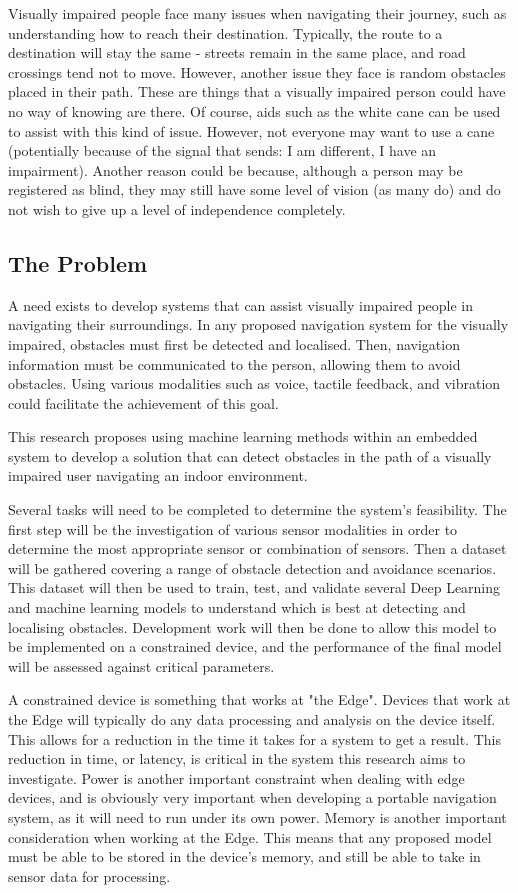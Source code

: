 \documentclass[conference]{IEEEtran}
\begin{document}
Visually impaired people face many issues when navigating their journey, such as understanding how to reach their destination. Typically, the route to a destination will stay the same - streets remain in the same place, and road crossings tend not to move. However, another issue they face is random obstacles placed in their path. These are things that a visually impaired person could have no way of knowing are there. Of course, aids such as the white cane can be used to assist with this kind of issue. However, not everyone may want to use a cane (potentially because of the signal that sends: I am different, I have an impairment). Another reason could be because, although a person may be registered as blind, they may still have some level of vision (as many do) and do not wish to give up a level of independence completely. 

\subsection{The Problem}
A need exists to develop systems that can assist visually impaired people in navigating their surroundings. In any proposed navigation system for the visually impaired, obstacles must first be detected and localised. Then, navigation information must be communicated to the person, allowing them to avoid obstacles. Using various modalities such as voice, tactile feedback, and vibration could facilitate the achievement of this goal.
 
This research proposes using machine learning methods within an embedded system to develop a solution that can detect obstacles in the path of a visually impaired user navigating an indoor environment. 
 
Several tasks will need to be completed to determine the system's feasibility. The first step will be the investigation of various sensor modalities in order to determine the most appropriate sensor or combination of sensors. Then a dataset will be gathered covering a range of obstacle detection and avoidance scenarios. This dataset will then be used to train, test, and validate several Deep Learning and machine learning models to understand which is best at detecting and localising obstacles. Development work will then be done to allow this model to be implemented on a constrained device, and the performance of the final model will be assessed against critical parameters.

A constrained device is something that works at "the Edge". Devices that work at the Edge will typically do any data processing and analysis on the device itself. This allows for a reduction in the time it takes for a system to get a result. This reduction in time, or latency, is critical in the system this research aims to investigate. Power is another important constraint when dealing with edge devices, and is obviously very important when developing a portable navigation system, as it will need to run under its own power. Memory is another important consideration when working at the Edge. This means that any proposed model must be able to be stored in the device's memory, and still be able to take in sensor data for processing. 
\end{document}

